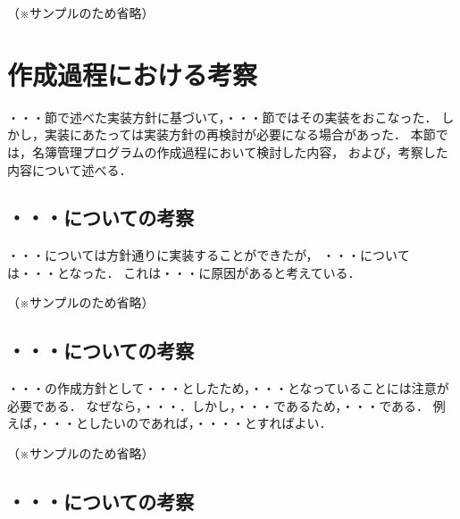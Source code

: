 \documentclass[a4j,11pt]{jarticle}
\begin{document}
（※サンプルのため省略）

\section{作成過程における考察}


・・・節で述べた実装方針に基づいて，・・・節ではその実装をおこなった．
しかし，実装にあたっては実装方針の再検討が必要になる場合があった．
本節では，名簿管理プログラムの作成過程において検討した内容，
および，考察した内容について述べる．

\subsection{・・・についての考察}

・・・については方針通りに実装することができたが，
・・・については・・・となった．
これは・・・に原因があると考えている．

（※サンプルのため省略）

\subsection{・・・についての考察}

・・・の作成方針として・・・としたため，・・・となっていることには注意が必要である．
なぜなら，・・・．しかし，・・・であるため，・・・である．
例えば，・・・としたいのであれば，・・・・とすればよい．

（※サンプルのため省略）

\subsection{・・・についての考察}
\end{document}
